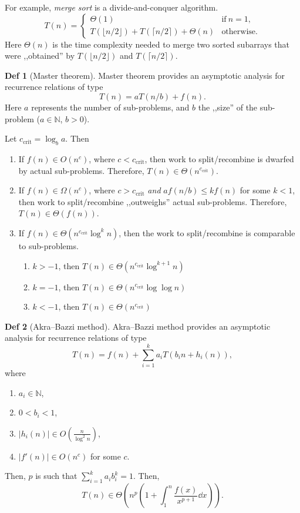 \documentclass[a4paper]{article}
\theoremstyle{definition}
\newtheorem{definition}{Def}
\begin{document}
For example, \textit{merge sort}
is a divide-and-conquer algorithm.
\[
  T(n) =
\begin{cases}
  \Theta(1) & \text{if}\ n = 1, \\
  T(\lfloor n/2 \rfloor) + T(\lceil n/2 \rceil) + \Theta(n) & \text{otherwise}.
\end{cases}
\]
Here \(\Theta(n)\) is the time complexity needed to merge two sorted subarrays
that were ,,obtained'' by
\(T(\lfloor n/2 \rfloor)\) and \(T(\lceil n/2 \rceil)\).

\begin{definition}[Master theorem]
  Master theorem provides an asymptotic analysis
  for recurrence relations of type
  \[
  T(n) = a T(n / b) + f(n)
  .\]
  Here \(a\) represents the number of sub-problems,
  and  \(b\) the ,,size'' of the sub-problem
  (\(a \in \mathbb{N}\), \(b > 0\)).
\end{definition}

\newcommand\ccrit{{c_\text{crit}}}

Let \(\ccrit = \log_b a\).
Then
\begin{enumerate}
  \item If \(f(n) \in O(n^c)\), where  \(c < \ccrit\), then
    work to split/recombine is dwarfed by actual sub-problems.
    Therefore, \(T(n) \in \Theta(n^\ccrit)\).
  \item If \(f(n) \in \Omega(n^c)\), where \(c > \ccrit\)
    \textit{and}
    \(a f(n/b) \le k f(n)\) for some \(k < 1\),
    then
    work to split/recombine ,,outweighs'' actual sub-problems.
    Therefore, \(T(n) \in \Theta(f(n))\).
  \item If \(f(n) \in \Theta(n^\ccrit \log^k n)\), then
    the work to split/recombine is comparable to sub-problems.
    \begin{enumerate}
      \item \(k > -1\), then \(T(n) \in \Theta(n^\ccrit \log^{k + 1} n)\)
      \item \(k = -1\), then \(T(n) \in \Theta(n^\ccrit \log \log n)\)
      \item \(k < -1\), then \(T(n) \in \Theta(n^\ccrit)\)
    \end{enumerate}
\end{enumerate}

\begin{definition}[Akra--Bazzi method]
  Akra--Bazzi method provides an asymptotic analysis for recurrence
  relations of type
  \[
    T(n) = f(n) + \sum_{i = 1}^k a_i T(b_i n + h_i(n)),
  \]
  where
  \begin{enumerate}
    \item \(a_i \in \mathbb{N}\),
    \item \(0 < b_i < 1\),
    \item \(|h_i(n)| \in O(\frac{n}{\log^2 n})\),
    \item \(|f'(n)| \in O(n^c)\) for some \(c\).
  \end{enumerate}
  Then, \(p\) is such that \(\sum_{i = 1}^k a_i b_i^k = 1\).
  Then,
  \[
    T(n) \in \Theta
    \left( n^p \left( 1 + \int_1^n \frac{f(x)}{x^{p + 1}} \dd x \right)  \right)
  .\]
\end{definition}
\end{document}
